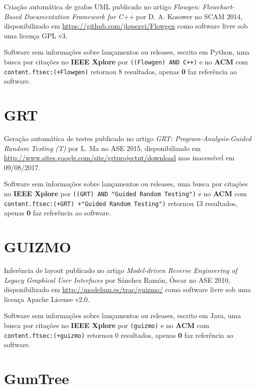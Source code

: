 Criação automática de grafos UML
publicado no artigo {\it Flowgen: Flowchart-Based Documentation Framework for C++}
por D. A. Kosower
no SCAM 2014,
disponibilizado em \url{https://github.com/jlopezvi/Flowgen}
como software livre
sob uma licença GPL v3.

Software sem informações sobre lançamentos ou releases,
escrito em Python,
uma busca por citações no {\bf IEEE Xplore} por
\texttt{((Flowgen) AND C++)}
e no {\bf ACM} com
\texttt{content.ftsec:(+Flowgen)}
retornou
8 resultados, apenas
{\bf 0} faz referência ao software.



\section{GRT}

Geração automática de testes
publicado no artigo {\it GRT: Program-Analysis-Guided Random Testing (T)}
por L. Ma
no ASE 2015,
disponibilizado em \url{http://www.sites.google.com/site/grtprojectut/download}
mas inacessível em 09/08/2017.

Software sem informações sobre lançamentos ou releases,
uma busca por citações no {\bf IEEE Xplore} por
\texttt{((GRT) AND "Guided Random Testing")}
e no {\bf ACM} com
\texttt{content.ftsec:(+GRT) +"Guided Random Testing")}
retornou
13 resultados, apenas
{\bf 0} faz referência ao software.



\section{GUIZMO}

Inferência de layout
publicado no artigo {\it Model-driven Reverse Engineering of Legacy Graphical User Interfaces}
por S\'{a}nchez Ram\'{o}n, \'{O}scar
no ASE 2010,
disponibilizado em \url{http://modelum.es/trac/guizmo/}
como software livre
sob uma licença Apache License v2.0.

Software sem informações sobre lançamentos ou releases,
escrito em Java,
uma busca por citações no {\bf IEEE Xplore} por
\texttt{(guizmo)}
e no {\bf ACM} com
\texttt{content.ftsec:(+guizmo)}
retornou
0 resultados, apenas
{\bf 0} faz referência ao software.



\section{GumTree}

